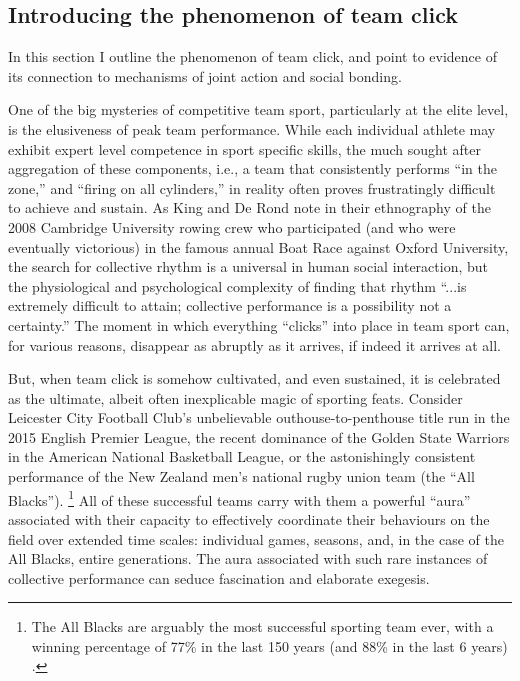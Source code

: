 \begin{CJK}{UTF8}{gbsn}
\subsection{Introducing the phenomenon of team click\label{sect:teamClickIntro}}

In this section I outline the phenomenon of team click, and point to evidence of its connection to mechanisms of joint action and social bonding.

One of the big mysteries of competitive team sport, particularly at the elite level, is the elusiveness of peak team performance.  While each individual athlete may exhibit expert level competence in sport specific skills, the much sought after aggregation of these components, i.e., a team that consistently performs ``in the zone,'' and ``firing on all cylinders,'' in reality often proves frustratingly difficult to achieve and sustain.  As King and De Rond \textcite[568]{King2011} note in their ethnography of the 2008 Cambridge University rowing crew who participated (and who were eventually victorious) in the famous annual Boat Race against Oxford University, the search for collective rhythm is a universal in human social interaction, but  the physiological and psychological complexity of finding that rhythm ``...is extremely difficult to attain; collective performance is a possibility not a certainty.''   The moment in which everything ``clicks'' into place in team sport can, for various reasons, disappear as abruptly as it arrives, if indeed it arrives at all.

But, when team click is somehow cultivated, and even sustained, it is celebrated as the ultimate, albeit often inexplicable magic of sporting feats. Consider Leicester City Football Club's unbelievable outhouse-to-penthouse title run in the 2015 English Premier League, the recent dominance of the Golden State Warriors in the American National Basketball League, or the astonishingly consistent performance of the New Zealand men's national rugby union team (the ``All Blacks'').
    \footnote{The All Blacks are arguably the most successful sporting team ever, with a winning percentage of 77\% in the last 150 years (and 88\% in the last 6 years) \citep{Kerr2013}.}
All of these successful teams carry with them a powerful ``aura'' associated with their capacity to effectively coordinate their behaviours on the field over extended time scales: individual games, seasons, and, in the case of the All Blacks, entire generations.  The aura associated with such rare instances of collective performance can seduce fascination and elaborate exegesis.


\end{CJK}
